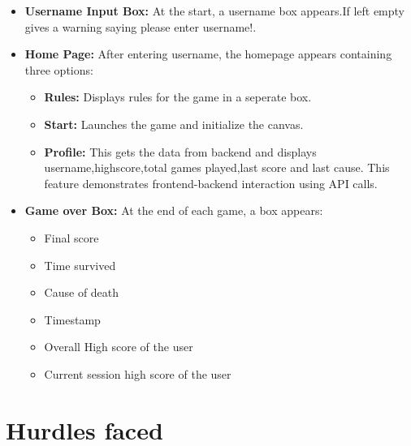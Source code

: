 \documentclass[12pt]{article}
\begin{document}
\begin{itemize}
    \item \textbf{Username Input Box:}
    At the start, a username box appears.If left empty gives a warning saying please enter username!.
    
    \item \textbf{Home Page:}
    After entering username, the homepage appears containing three options:
    \begin{itemize}
        \item \textbf{Rules:} Displays rules for the game in a seperate box.
        \item \textbf{Start:} Launches the game and initialize the canvas.
        \item \textbf{Profile:} This gets the data from backend and displays username,highscore,total games played,last score and last cause.
        This feature demonstrates frontend-backend interaction using API calls.
    \end{itemize}

    \item \textbf{Game over Box:}
    At the end of each game, a box appears:
    \begin{itemize}
        \item Final score
        \item Time survived
        \item Cause of death
        \item Timestamp
        \item Overall High score of the user
        \item Current session high score of the user
    \end{itemize}
\end{itemize}


\section{Hurdles faced}
\end{document}
